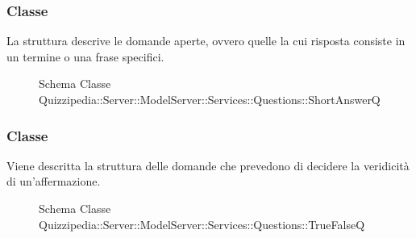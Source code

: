 \subsubsection{Classe }
La struttura descrive le domande aperte, ovvero quelle la cui risposta consiste in un termine o una frase specifici.
\begin{figure}[H]
\centering
\noindent{}
\caption[Schema Classe ShortAnswerQ]{Schema Classe Quizzipedia::Server::ModelServer::Services::Questions::ShortAnswerQ}
\end{figure}
\subsubsection{Classe }
Viene descritta la struttura delle domande che prevedono di decidere la veridicità di un'affermazione.
\begin{figure}[H]
\centering
\noindent{}
\caption[Schema Classe TrueFalseQ]{Schema Classe Quizzipedia::Server::ModelServer::Services::Questions::TrueFalseQ}
\end{figure}
